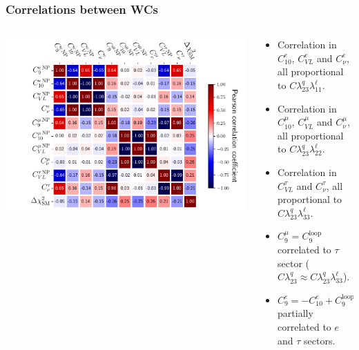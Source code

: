 \documentclass[mathserif, 10pt]{beamer}
\begin{document}
\begin{frame}
    \frametitle{Correlations between WCs}

    \begin{columns}
        \begin{column}{0.5\textwidth}
            \includegraphics[width=\columnwidth]{figures/coeffcorr.pdf}
        \end{column}
        \begin{column}{0.5\textwidth}
            \begin{itemize}
                \item Correlation in $C_{10}^e$, $C_{VL}^e$ and $C_\nu^e$, all proportional to $C \lambda^q_{23} \lambda^\ell_{11}$.
                \item Correlation in $C_{10}^\mu$, $C_{VL}^\mu$ and $C_\nu^\mu$, all proportional to $C \lambda^q_{23} \lambda^\ell_{22}$.
                \item Correlation in $C_{VL}^\tau$ and $C_\nu^\tau$, all proportional to $C \lambda^q_{23} \lambda^\ell_{33}$.
                \item $C_9^\mu = C_9^\mathrm{loop}$ correlated to $\tau$ sector ($C\lambda^q_{23} \approx C\lambda^q_{23} \lambda^\ell_{33}$).
                \item $C_9^e = -C_{10}^e + C_9^\mathrm{loop}$ partially correlated to $e$ and $\tau$ sectors.
            \end{itemize}
            
        \end{column}
    \end{columns}

\end{frame}
\end{document}
